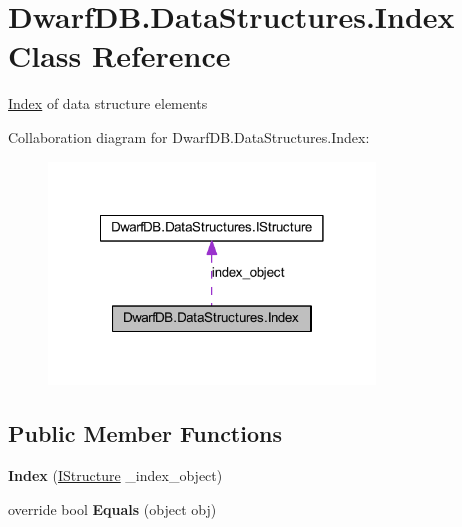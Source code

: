 \hypertarget{class_dwarf_d_b_1_1_data_structures_1_1_index}{\section{Dwarf\+D\+B.\+Data\+Structures.\+Index Class Reference}
\label{class_dwarf_d_b_1_1_data_structures_1_1_index}
}


\hyperlink{class_dwarf_d_b_1_1_data_structures_1_1_index}{Index} of data structure elements  




Collaboration diagram for Dwarf\+D\+B.\+Data\+Structures.\+Index\+:
\nopagebreak
\begin{figure}[H]
\begin{center}
\leavevmode
\includegraphics[width=246pt]{class_dwarf_d_b_1_1_data_structures_1_1_index__coll__graph}
\end{center}
\end{figure}
\subsection*{Public Member Functions}
\begin{DoxyCompactItemize}
\item 
\hypertarget{class_dwarf_d_b_1_1_data_structures_1_1_index_a2481d361d4dbf7cb81f094a834b93214}{{\bfseries Index} (\hyperlink{interface_dwarf_d_b_1_1_data_structures_1_1_i_structure}{I\+Structure} \+\_\+index\+\_\+object)}\label{class_dwarf_d_b_1_1_data_structures_1_1_index_a2481d361d4dbf7cb81f094a834b93214}

\item 
\hypertarget{class_dwarf_d_b_1_1_data_structures_1_1_index_aef1cd3ec762c296c9ced22ab8ed4ab12}{override bool {\bfseries Equals} (object obj)}\label{class_dwarf_d_b_1_1_data_structures_1_1_index_aef1cd3ec762c296c9ced22ab8ed4ab12}

\end{DoxyCompactItemize}
